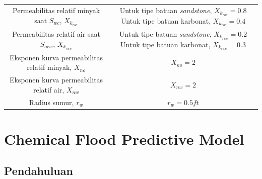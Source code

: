 \documentclass[
]{book}
\begin{document}
\begin{longtable}[]{@{}cc@{}}
\begin{minipage}[t]{0.47\columnwidth}
Permeabilitas relatif minyak saat \(S_{wc}\), \(X_{k_{roe}}\)\strut
\end{minipage} & \begin{minipage}[t]{0.47\columnwidth}\centering
Untuk tipe batuan \emph{sandstone}, \(X_{k_{roe}}=0.8\) Untuk tipe batuan karbonat, \(X_{k_{roe}}=0.4\)\strut
\end{minipage}\tabularnewline
\begin{minipage}[t]{0.47\columnwidth}\centering
Permeabilitas relatif air saat \(S_{orw}\), \(X_{k_{rwe}}\)\strut
\end{minipage} & \begin{minipage}[t]{0.47\columnwidth}\centering
Untuk tipe batuan \emph{sandstone}, \(X_{k_{rwe}}=0.2\) Untuk tipe batuan karbonat, \(X_{k_{rwe}}=0.3\)\strut
\end{minipage}\tabularnewline
\begin{minipage}[t]{0.47\columnwidth}\centering
Eksponen kurva permeabilitas relatif minyak, \(X_{no}\)\strut
\end{minipage} & \begin{minipage}[t]{0.47\columnwidth}\centering
\(X_{no}=2\)\strut
\end{minipage}\tabularnewline
\begin{minipage}[t]{0.47\columnwidth}\centering
Eksponen kurva permeabilitas relatif air, \(X_{nw}\)\strut
\end{minipage} & \begin{minipage}[t]{0.47\columnwidth}\centering
\(X_{nw}=2\)\strut
\end{minipage}\tabularnewline
\begin{minipage}[t]{0.47\columnwidth}\centering
Radius sumur, \(r_w\)\strut
\end{minipage} & \begin{minipage}[t]{0.47\columnwidth}\centering
\(r_w=0.5ft\)\strut
\end{minipage}\tabularnewline
\bottomrule
\end{longtable}

\hypertarget{chemical-flood-predictive-model}{%
\chapter{Chemical Flood Predictive Model}\label{chemical-flood-predictive-model}}

\hypertarget{pendahuluan-2}{%
\section{Pendahuluan}\label{pendahuluan-2}}
\end{document}
